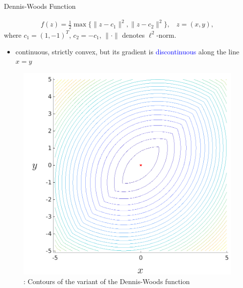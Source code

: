 \documentclass{beamer}
\begin{document}
\begin{frame}{Dennis-Woods Function}

\footnotesize{
\begin{align*}
	f(z) = \frac{1}{2}\max\{\|z - c_1 \|^2, \|z - c_2
	\|^2\}, ~~~~ z = (x,y),
	\label{eqn:dwfun}
\end{align*}
where $c_1 = (1,-1)^T$, $c_2 = -c_1$, $\|\cdot\|$ denotes
$\ell^2$-norm.
\begin{itemize}
	\item continuous, strictly convex, but its gradient is
		\textcolor{blue}{discontinuous} along the line $x=y$
\end{itemize}
}
\begin{figure}[!htbp]
	\centering
	  \includegraphics[scale=0.13]{./figures/dWoods.png}
	  \vspace{-0.1cm}
	\footnotesize{
	\caption{: Contours of the variant of the Dennis-Woods function}
	}
\label{fig:dwfun}
\end{figure}
\end{frame}
\end{document}
